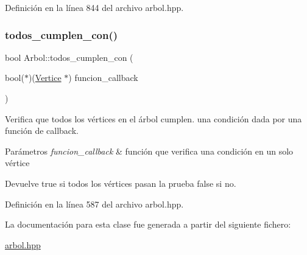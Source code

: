 Definición en la línea 844 del archivo arbol.\+hpp.

\mbox{\label{classArbol_aba4b09fef18152beb43e04fee7394f34}} 
\subsubsection{\texorpdfstring{todos\+\_\+cumplen\+\_\+con()}{todos\_cumplen\_con()}}
{\footnotesize\ttfamily bool Arbol\+::todos\+\_\+cumplen\+\_\+con (\begin{DoxyParamCaption}\item[{bool($\ast$)(\hyperlink{classVertice}{Vertice} $\ast$)}]{funcion\+\_\+callback }\end{DoxyParamCaption})\hspace{0.3cm}{\ttfamily [protected]}}



Verifica que todos los vértices en el árbol cumplen. una condición dada por una función de callback. 


\begin{DoxyParams}{Parámetros}
{\em funcion\+\_\+callback} & función que verifica una condición en un solo vértice \\
\hline
\end{DoxyParams}
\begin{DoxyReturn}{Devuelve}
true si todos los vértices pasan la prueba false si no. 
\end{DoxyReturn}


Definición en la línea 587 del archivo arbol.\+hpp.



La documentación para esta clase fue generada a partir del siguiente fichero\+:\begin{DoxyCompactItemize}
\item 
\hyperlink{arbol_8hpp}{arbol.\+hpp}\end{DoxyCompactItemize}
